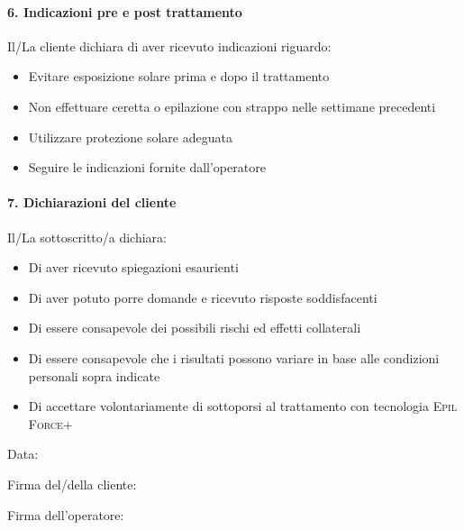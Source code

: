 \paragraph*{6. Indicazioni pre e post trattamento}
Il/La cliente dichiara di aver ricevuto indicazioni riguardo:
\begin{itemize}
    \item Evitare esposizione solare prima e dopo il trattamento
    \item Non effettuare ceretta o epilazione con strappo nelle settimane precedenti
    \item Utilizzare protezione solare adeguata
    \item Seguire le indicazioni fornite dall'operatore
\end{itemize}

\paragraph*{7. Dichiarazioni del cliente}
Il/La sottoscritto/a dichiara:
\begin{itemize}
    \item Di aver ricevuto spiegazioni esaurienti
    \item Di aver potuto porre domande e ricevuto risposte soddisfacenti
    \item Di essere consapevole dei possibili rischi ed effetti collaterali
    \item Di essere consapevole che i risultati possono variare in base alle condizioni personali sopra indicate
    \item Di accettare volontariamente di sottoporsi al trattamento con tecnologia \textsc{Epil Force+}
\end{itemize}

\vspace{1cm}
\noindent
Data: \underline{\hspace{5cm}}

\vspace{0.8cm}
\noindent
Firma del/della cliente: \underline{\hspace{7cm}}

\vspace{0.8cm}
\noindent
Firma dell'operatore: \underline{\hspace{6.5cm}}

